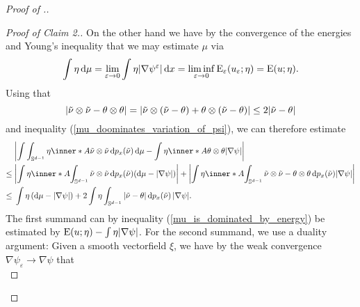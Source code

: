 \begin{proof}[Proof of .]
\begin{proof}[Proof of Claim 2.]
		On the other hand we have by the convergence of the energies and 
		Young's inequality that we 
		may estimate $ \mu $ via 
		\begin{equation}
			\label{mu_is_dominated_by_energy}
			\int
				\eta
			\dd{ \mu }
			=
			\lim_{ \varepsilon \to 0 }
				\int
					\eta
					\abs{ \nabla \psi^{ \varepsilon } }
				\dd{ x }
			=
			\liminf_{ \varepsilon \to 0 }
				\operatorname{E}_{ \varepsilon } ( u_{ \varepsilon } ; \eta )
			=
			\operatorname{E} ( u ; \eta ).
		\end{equation}
		Using that
		\begin{equation*} 
			\abs{ \tilde{ \nu } \otimes \tilde{ \nu } - \theta \otimes \theta } 
			= 
			\abs{ 
				\tilde{ \nu } \otimes ( \tilde{ \nu } - \theta ) 
				+
				\theta \otimes ( \tilde{ \nu } - \theta ) 
			}
			\leq
			2 \abs{ \tilde{ \nu } - \theta }
		\end{equation*}
		and inequality (\ref{mu_doominates_variation_of_psi}), we can therefore 
		estimate
		\begin{align*}
			&
			\abs{ 
				\int
					\int_{ \mathbb{ S }^{ d - 1 } }
						\eta
						\inner*{ A }{ \tilde{ \nu } \otimes \tilde{ \nu } }
					\dd{ p_{ x } ( \tilde{ \nu } ) }
				\dd{ \mu }
				-
				\int
					\eta
					\inner*{ A }{ \theta \otimes \theta }
				\abs{ \nabla \psi }
			}
			\\
			\leq{} &
			\abs{ 
				\int
					\eta 
					\inner*{ A }
					{ 
						\int_{ \mathbb{ S }^{ d - 1 } }
							\tilde{ \nu } \otimes \tilde{ \nu }
						\dd{ p_{ x } ( \tilde{ \nu } ) }
					}
				( \dd{ \mu } - \abs{ \nabla \psi } )
			}
			+
			\abs{
				\int
					\eta
					\inner*{ A }{
						\int_{ \mathbb{ S }^{ d - 1 } }
							\tilde{ \nu } \otimes \tilde{ \nu }
							-
							\theta \otimes \theta
						\dd{ p_{ x } ( \tilde{ \nu } ) }
					}
				\abs{ \nabla \psi }
			}
			\\
			\leq {} &
			\int
				\eta
			\left( \dd{ \mu } - \abs{ \nabla \psi } \right)
			+
			2
			\int
				\eta
				\int_{ \mathbb{ S }^{ d - 1 } }
					\abs{ \tilde{ \nu } - \theta } 
				\dd{ p_{ x } ( \tilde{ \nu } ) }
			\abs{ \nabla \psi }.
		\end{align*}
		The first summand can by inequality (\ref{mu_is_dominated_by_energy}) 
		be estimated by 
		$ \operatorname{E} ( u ; \eta ) - \int \eta \abs{ \nabla \psi } $.
		For the second summand, we use a duality argument:
		Given a smooth vectorfield $ \xi $, we have by the weak convergence $ 
		\nabla \psi_{ \varepsilon } \to \nabla \psi $ that
		\begin{equation*}

\end{equation*}
\end{proof}
\end{proof}
